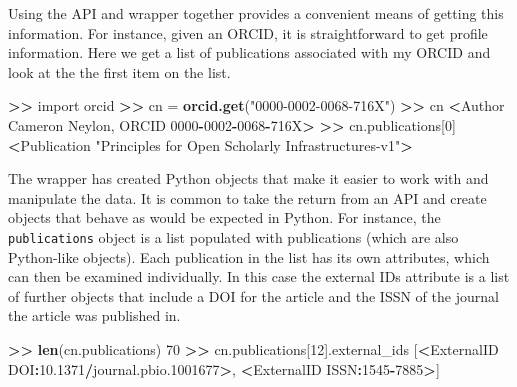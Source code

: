 \documentclass[]{krantz}
\newenvironment{Shaded}{\begin{snugshade}}{\end{snugshade}}
\newcommand{\KeywordTok}[1]{\textcolor[rgb]{0.13,0.29,0.53}{\textbf{#1}}}
\newcommand{\DecValTok}[1]{\textcolor[rgb]{0.00,0.00,0.81}{#1}}
\newcommand{\FloatTok}[1]{\textcolor[rgb]{0.00,0.00,0.81}{#1}}
\newcommand{\StringTok}[1]{\textcolor[rgb]{0.31,0.60,0.02}{#1}}
\newcommand{\OperatorTok}[1]{\textcolor[rgb]{0.81,0.36,0.00}{\textbf{#1}}}
\newcommand{\ErrorTok}[1]{\textcolor[rgb]{0.64,0.00,0.00}{\textbf{#1}}}
\newcommand{\NormalTok}[1]{#1}
\begin{document}
\pagebreak
Using the API and wrapper together provides a convenient means of
getting this information. For instance, given an ORCID, it is
straightforward to get profile information. Here we get a list of
publications associated with my ORCID and look at the the first item on
the list.

\begin{Shaded}
\begin{Highlighting}[]
\OperatorTok{>}\ErrorTok{>}\StringTok{ }\NormalTok{import orcid}
\OperatorTok{>}\ErrorTok{>}\StringTok{ }\NormalTok{cn =}\StringTok{ }\KeywordTok{orcid.get}\NormalTok{(}\StringTok{"0000-0002-0068-716X"}\NormalTok{)}
\OperatorTok{>}\ErrorTok{>}\StringTok{ }\NormalTok{cn}
\OperatorTok{<}\NormalTok{Author Cameron Neylon, ORCID }\DecValTok{0000}\OperatorTok{-}\DecValTok{0002}\OperatorTok{-}\DecValTok{0068}\OperatorTok{-}\NormalTok{716X}\OperatorTok{>}
\ErrorTok{>>}\StringTok{ }\NormalTok{cn.publications[}\DecValTok{0}\NormalTok{]}
\OperatorTok{<}\NormalTok{Publication }\StringTok{"Principles for Open Scholarly Infrastructures-v1"}\OperatorTok{>}
\end{Highlighting}
\end{Shaded}

The wrapper has created Python objects that make it easier to work with
and manipulate the data. It is common to take the return from an API and
create objects that behave as would be expected in Python. For instance,
the \texttt{publications} object is a list populated with publications
(which are also Python-like objects). Each publication in the list has
its own attributes, which can then be examined individually. In this
case the external IDs attribute is a list of further objects that
include a DOI for the article and the ISSN of the journal the article
was published in.

\begin{Shaded}
\begin{Highlighting}[]
\OperatorTok{>}\ErrorTok{>}\StringTok{ }\KeywordTok{len}\NormalTok{(cn.publications)}
\DecValTok{70}
\OperatorTok{>}\ErrorTok{>}\StringTok{ }\NormalTok{cn.publications[}\DecValTok{12}\NormalTok{].external_ids}
\NormalTok{[}\OperatorTok{<}\NormalTok{ExternalID DOI}\OperatorTok{:}\FloatTok{10.1371}\OperatorTok{/}\NormalTok{journal.pbio.}\DecValTok{1001677}\OperatorTok{>}\NormalTok{, }\OperatorTok{<}\NormalTok{ExternalID ISSN}\OperatorTok{:}\DecValTok{1545}\OperatorTok{-}\DecValTok{7885}\OperatorTok{>}\NormalTok{]}
\end{Highlighting}
\end{Shaded}
\end{document}

